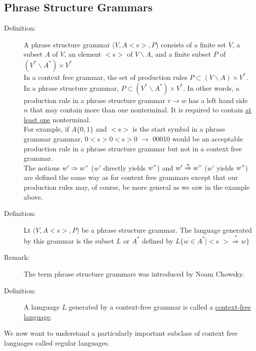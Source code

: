 \documentclass[10pt]{article}
\begin{document}
	\subsection{Phrase Structure Grammars}
	\begin{description}
		\item[Definition:] A phrase structure grammar $(V, A <$s$>, P)$ consists of a finite set $V$, a subset $A$ of $V$, an element $<$s$>$ of $V \backslash A$, and a finite subset $P$ of $(V^* \backslash A^*) \times V^*$ \\
		In a context free grammar, the set of production rules $P \subset (V \backslash A) \times V^*$. \\
		In a phrase structure grammar, $P \subset (V^* \backslash A^*) \times V^*$. In other words, a production rule in a phrase structure grammar $r \rightarrow w$ has a left hand side $n$ that may contain more than one nonterminal. It is required to contain \underline{at least one} nonterminal. \\
		For example, if $A \{0, 1\}$ and $<$s$>$ is the start symbol in a phrase grammar grammar, 0$<$s$>$0$<$s$>$0 $\rightarrow$ 00010 would be an acceptable production rule in a phrase structure grammar but not in a context free grammar. \\
		The notions $w' \Rightarrow w"$ ($w'$ directly yields $w"$) and $w' \overset{*}{\Rightarrow} w"$ ($w'$ yields $w"$) are defined the same way as for context free grammars except that our production rules may, of course, be more general as we saw in the example above.
		\item[Definition:] Lt $(V, A <$s$>, P)$ be a phrase structure grammar. The language generated by this grammar is the subset $L$ or $A^*$ defined by $L \{w \in A^* \mid <$s $>\overset{*}{\Rightarrow} w \}$
		\item[Remark:] The term phrase structure grammars was introduced by Noam Chowsky.
		\item[Definition:] A lamguage $L$ generated by a context-free grammar is called a \underline{context-free language}.
	\end{description}
	We now want to understand a particularly important subclass of context free languages called regular languages.
	
\end{document}

